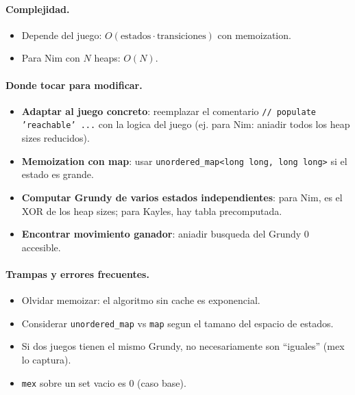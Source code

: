 \paragraph{Complejidad.}
\begin{itemize}\setlength\itemsep{0pt}
	\item Depende del juego: $O(\text{estados} \cdot \text{transiciones})$ con memoization.
	\item Para Nim con $N$ heaps: $O(N)$.
\end{itemize}

\paragraph{Donde tocar para modificar.}
\begin{itemize}\setlength\itemsep{0pt}
	\item \textbf{Adaptar al juego concreto}: reemplazar el comentario \texttt{// populate 'reachable' ...} con la logica del juego (ej. para Nim: aniadir todos los heap sizes reducidos).
	\item \textbf{Memoization con map}: usar \texttt{unordered\_map<long long, long long>} si el estado es grande.
	\item \textbf{Computar Grundy de varios estados independientes}: para Nim, es el XOR de los heap sizes; para Kayles, hay tabla precomputada.
	\item \textbf{Encontrar movimiento ganador}: aniadir busqueda del Grundy $0$ accesible.
\end{itemize}

\paragraph{Trampas y errores frecuentes.}
\begin{itemize}\setlength\itemsep{0pt}
	\item Olvidar memoizar: el algoritmo sin cache es exponencial.
	\item Considerar \texttt{unordered\_map} vs \texttt{map} segun el tamano del espacio de estados.
	\item Si dos juegos tienen el mismo Grundy, no necesariamente son ``iguales'' (mex lo captura).
	\item \texttt{mex} sobre un set vacio es 0 (caso base).
\end{itemize}

